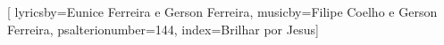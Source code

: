 %

\setcounter{songnum}{144}

[
lyricsby={Eunice Ferreira e Gerson Ferreira},
musicby={Filipe Coelho e Gerson Ferreira},
psalterionumber=144,
index={Brilhar por Jesus}]


